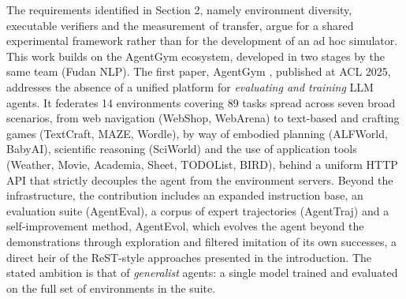 \documentclass[11pt,a4paper]{article}
\begin{document}
The requirements identified in Section 2, namely environment diversity, executable verifiers and the measurement of transfer, argue for a shared experimental framework rather than for the development of an ad hoc simulator. This work builds on the AgentGym ecosystem, developed in two stages by the same team (Fudan NLP). The first paper, AgentGym \cite{xi_agentgym_2025}, published at ACL 2025, addresses the absence of a unified platform for \emph{evaluating and training} LLM agents. It federates 14 environments covering 89 tasks spread across seven broad scenarios, from web navigation (WebShop, WebArena) to text-based and crafting games (TextCraft, MAZE, Wordle), by way of embodied planning (ALFWorld, BabyAI), scientific reasoning (SciWorld) and the use of application tools (Weather, Movie, Academia, Sheet, TODOList, BIRD), behind a uniform HTTP API that strictly decouples the agent from the environment servers. Beyond the infrastructure, the contribution includes an expanded instruction base, an evaluation suite (AgentEval), a corpus of expert trajectories (AgentTraj) and a self-improvement method, AgentEvol, which evolves the agent beyond the demonstrations through exploration and filtered imitation of its own successes, a direct heir of the ReST-style approaches presented in the introduction. The stated ambition is that of \emph{generalist} agents: a single model trained and evaluated on the full set of environments in the suite.
\end{document}
